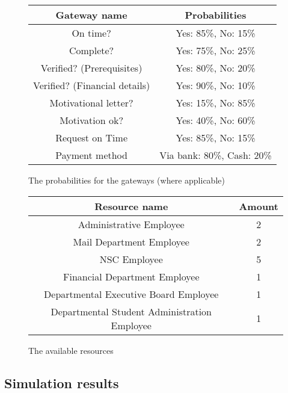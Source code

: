 \begin{figure}[h!]
	\centering
	\begin{tabular}{ | c | c | }
		\hline
		\textbf{Gateway name} & \textbf{Probabilities} \\ \hline\hline
		On time? & Yes: 85\%, No: 15\% \\ \hline
		Complete? & Yes: 75\%, No: 25\% \\ \hline
		Verified? (Prerequisites) & Yes: 80\%, No: 20\% \\ \hline
		Verified? (Financial details) & Yes: 90\%, No: 10\% \\ \hline
		Motivational letter? & Yes: 15\%, No: 85\% \\ \hline
		Motivation ok? & Yes: 40\%, No: 60\% \\ \hline
		Request on Time & Yes: 85\%, No: 15\% \\ \hline	
		Payment method & Via bank: 80\%, Cash: 20\% \\ \hline			
		\hline
	\end{tabular}
	\caption{The probabilities for the gateways (where applicable)}
	\label{fig:probabilities1}
\end{figure}

\begin{figure}[h!]
	\centering
	\begin{tabular}{ | c | c | }
		\hline
		\textbf{Resource name} & \textbf{Amount} \\ \hline\hline
		Administrative Employee & 2 \\ \hline		
		Mail Department Employee & 2 \\ \hline
		NSC Employee & 5 \\ \hline
		Financial Department Employee & 1 \\ \hline
		Departmental Executive Board Employee & 1 \\ \hline
		Departmental Student Administration Employee & 1 \\ \hline
		\hline
	\end{tabular}
	\caption{The available resources}
	\label{fig:resources}
\end{figure}


\subsection{Simulation results}